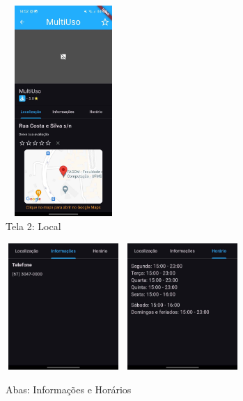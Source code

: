     \begin{figure}[h]
        \centering
        \includegraphics[width=44mm,height=80mm]{imagens/local.jpg}
        \caption{\scriptsize Tela 2: Local}
        \footnotesize  {}
        \label{fig:tela2}
    \end{figure}

    \begin{figure}
        \centering
        \includegraphics[width=44mm,height=48mm]{imagens/info.jpg}
        \hspace{10mm}
        \includegraphics[width=44mm,height=48mm]{imagens/horario.jpg}
        \caption{\scriptsize Abas: Informações e Horários}
        \footnotesize  {}
        \label{fig:tela2-abas}
    \end{figure}

